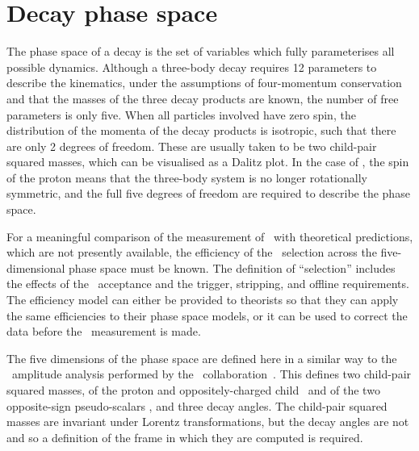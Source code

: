 \section{Decay phase space}
\label{chap:cpv:theory:phsp}

The phase space of a decay is the set of variables which fully parameterises
all possible dynamics.
Although a three-body decay requires 12 parameters to describe the kinematics,
under the assumptions of four-momentum conservation and that the masses of the
three decay products are known, the number of free parameters is only five.
When all particles involved have zero spin, the distribution of the momenta of
the decay products is isotropic, such that there are only 2 degrees of freedom.
These are usually taken to be two child-pair squared masses, which can be
visualised as a Dalitz plot.
In the case of \LcTophh, the spin  of the proton means that the
three-body system is no longer rotationally symmetric, and the full five
degrees of freedom are required to describe the phase space.

For a meaningful comparison of the measurement of \dACP\ with theoretical
predictions, which are not presently available, the efficiency of the
\PLambdac\ selection across the five-dimensional phase space must be known.
The definition of ``selection'' includes the effects of the \lhcb\ acceptance
and the trigger, stripping, and offline requirements.
The efficiency model can either be provided to theorists so that they can apply
the same efficiencies to their phase space models, or it can be used to correct
the data before the \dACP\ measurement is made.

The five dimensions of the phase space are defined here in a similar way to the
\LcTopKpi\ amplitude analysis performed by the \esno\
collaboration~\cite{Aitala:1999uq}.
This defines two child-pair squared masses, of the proton and
oppositely-charged child \msqphm\ and of the two opposite-sign pseudo-scalars
\msqhh, and three decay angles.
The child-pair squared masses are invariant under Lorentz transformations, but
the decay angles are not and so a definition of the frame in which they are
computed is required.

